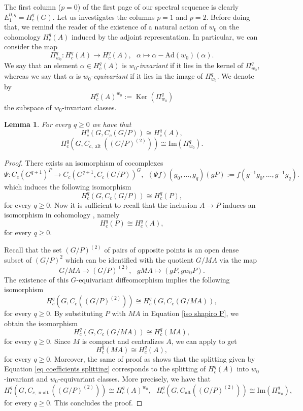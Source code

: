 \documentclass[a4paper]{amsart}
\newtheorem{lem}{Lemma}[section]
\theoremstyle{definition}
\theoremstyle{remark}
\theoremstyle{TheoremNum}
\DeclareMathOperator{\Ker}{Ker}
\DeclareMathOperator{\alt}{\mathrm{alt}}
\DeclareMathOperator{\nalt}{\mathrm{n-alt}}
\begin{document}
The first column ($p=0$) of the first page of our spectral sequence is clearly $E_1^{0,q}=H^q_c(G)$. Let us investigates the columns $p=1$ and $p=2$. Before doing that, we remind the reader of the existence of a natural action of $w_0$ on the cohomology $H^q_c(A)$ induced by the adjoint representation. In particular, we can consider the map 
$$
\Pi^q_{w_0}:H^q_c(A) \rightarrow H^q_c(A), \  \ \ \alpha \mapsto \alpha-\mathrm{Ad}(w_0)(\alpha). 
$$
We say that an element $\alpha \in H^q_c(A)$ is $w_0$-\emph{invariant} if it lies in the kernel of $\Pi^q_{w_0}$, whereas we say that $\alpha$ is $w_0$-\emph{equivariant} if it lies in the image of $\Pi^q_{w_0}$. We denote by 
$$
H^q_c(A)^{w_0}:=\Ker(\Pi^q_{w_0})
$$
the subspace of $w_0$-invariant classes. 

\begin{lem}\label{lem first two columns}
For every $q \geq 0$ we have that
$$
H^q_c(G,C_c(G/P)) \cong H^q_c(A),
$$
$$
H^q_c(G,C_{c,\alt}((G/P)^{(2)})) \cong \mathrm{Im}(\Pi^q_{w_0}).
$$
\end{lem} 

\begin{proof}
There exists an isomorphism of cocomplexes
\begin{equation}\label{iso shapiro P}
\Psi:C_c(G^{q+1})^P \longrightarrow C_c(G^{q+1},C_c(G/P))^G, \ \  (\Psi f)(g_0,\ldots,g_q)(gP):=f(g^{-1}g_0,\ldots,g^{-1}g_q).
\end{equation}
which induces the following isomorphism
$$
H^q_c(G,C_c(G/P)) \cong H_c^q(P),
$$
for every $q \geq 0$. Now it is sufficient to recall that the inclusion $A \rightarrow P$ induces an isomorphism in cohomology \cite[Proposition 3.1]{Monod}, namely
$$
H^q_c(P) \cong H^q_c(A),
$$
for every $q \geq 0$. 

Recall that the set $(G/P)^{(2)}$ of pairs of opposite points is an open dense subset of $(G/P)^2$ which can be identified with the quotient $G/MA$ via the map
$$
G/MA \rightarrow (G/P)^{(2)},  \ \ \ gMA \mapsto (gP,gw_0P).
$$
The existence of this $G$-equivariant diffeomorphism implies the following isomorphism
$$
H^q_c(G,C_c((G/P)^{(2)})) \cong H^q_c(G,C_c(G/MA)),
$$
for every $q \geq 0$. By substituting $P$ with $MA$ in Equation \eqref{iso shapiro P}, we obtain the isomorphism
$$
H^q_c(G,C_c(G/MA)) \cong H_c^q(MA),
$$
for every $q \geq 0$. Since $M$ is compact and centralizes $A$, we can apply \cite[Theorem 9.1]{Blanc} to get 
$$
H^q_c(MA) \cong H^q_c(A),
$$
for every $q \geq 0$. Moreover, the same of proof as \cite[Proposition 8]{BucSavAlt} shows that the splitting given by Equation \eqref{eq coefficients splitting} corresponds to the splitting of $H^q_c(A)$ into $w_0$-invariant and $w_0$-equivariant classes. More precisely, we have that 
$$
H^q_c(G,C_{c,\nalt}((G/P)^{(2)})) \cong H^q_c(A)^{w_0}, \ \ \ H^q_c(G,C_{\alt}((G/P)^{(2)})) \cong \mathrm{Im}(\Pi^q_{w_0}), 
$$
for every $q \geq 0$. This concludes the proof. 
\end{proof}
\end{document}
